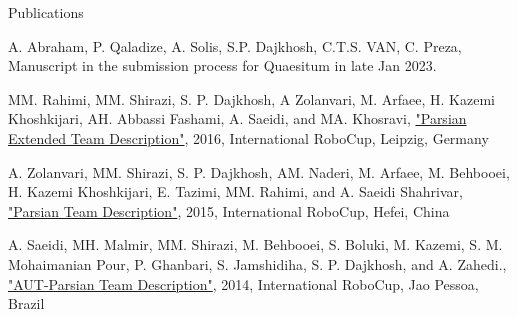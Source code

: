 \begin{cventries}
    \cventry
    {} %
    {Publications} %
    {} %
    {} %
    {
      \begin{cvitems} %
        \item{A. Abraham, P. Qaladize, A. Solis, S.P. Dajkhosh, C.T.S. VAN, C. Preza, Manuscript in the submission process for Quaesitum in late Jan 2023.}
        \item{MM. Rahimi, MM. Shirazi, S. P. Dajkhosh, A Zolanvari, M. Arfaee, H. Kazemi Khoshkijari, AH. Abbassi Fashami, A. Saeidi, and MA. Khosravi, \href{https://sites.google.com/view/steacher/amirkabir-university}{"Parsian Extended Team Description"}, 2016, International RoboCup, Leipzig, Germany}
        \item{A. Zolanvari, MM. Shirazi, S. P. Dajkhosh, AM. Naderi, M. Arfaee, M. Behbooei, H. Kazemi Khoshkijari, E. Tazimi, MM. Rahimi, and A. Saeidi Shahrivar, \href{https://sites.google.com/view/steacher/amirkabir-university}{"Parsian Team Description"}, 2015, International RoboCup, Hefei, China}
        \item{A. Saeidi, MH. Malmir, MM.  Shirazi, M.
        Behbooei, S. Boluki, M. Kazemi, S. M. Mohaimanian Pour, P. Ghanbari, S. Jamshidiha, S. P. Dajkhosh, and A. Zahedi., \href{https://sites.google.com/view/steacher/amirkabir-university}{"AUT-Parsian Team Description"}, 2014, International RoboCup, Jao Pessoa, Brazil}
      \end{cvitems}
    }
\end{cventries}
